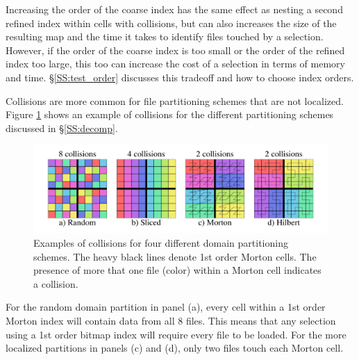 \documentclass[apjl]{emulateapj}
\begin{document}
Increasing the order of the coarse index has the same effect as nesting a second refined index within cells with collisions, but can also increases the size of the resulting map and the time it takes to identify files touched by a selection. However, if the order of the coarse index is too small or the order of the refined index too large, this too can increase the cost of a selection in terms of memory and time. \S\ref{SS:test_order} discusses this tradeoff and how to choose index orders.

Collisions are more common for file partitioning schemes that are not localized. Figure \ref{fig:collision_files} shows an example of collisions for the different partitioning schemes discussed in \S\ref{SS:decomp}.
%
\begin{figure}[htbp]
\begin{center}
\includegraphics[width=\columnwidth,keepaspectratio]{../images/index.png}
\caption{Examples of collisions for four different domain partitioning schemes. The heavy black lines denote 1st order Morton cells. The presence of more that one file (color) within a Morton cell indicates a collision.}
\label{fig:collision_files}
\end{center}
\end{figure}
%
For the random domain partition in panel (a), every cell within a 1st order Morton index will contain data from all 8 files. This means that any selection using a 1st order bitmap index will require every file to be loaded. For the more localized partitions in panels (c) and (d), only two files touch each Morton cell.

\end{document}
